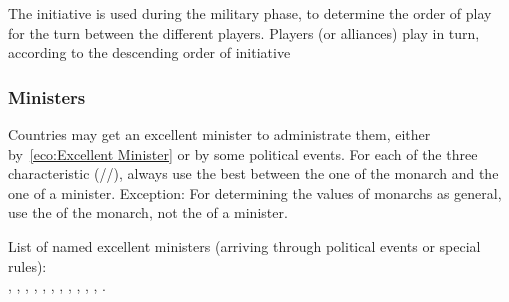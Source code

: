 \aparag The initiative is used during the military phase, to determine the
order of play for the turn between the different players.
\bparag Players (or alliances) play in turn, according to the descending order
of initiative


\subsubsection{Ministers}
\aparag Countries may get an excellent minister to administrate them, either
by~\ref{eco:Excellent Minister} or by some political events.
\bparag For each of the three characteristic (\ADM/\DIP/\MIL), always use the
best between the one of the monarch and the one of a minister.
\bparag Exception: For determining the values of monarchs as general, use the
\MIL of the monarch, not the \MIL of a minister.

\aparag List of named excellent ministers (arriving through political events
or special rules):\\
\ministrePitt, \ministreRichelieu, \ministreMazarin, \ministreColbert,
\ministrePatkul, \ministrePotemkine, \ministreOxenstierna, \ministreKoprulu,
\ministreOlivares, %
, \ministreHeinsius, \ministreKaunitz.






